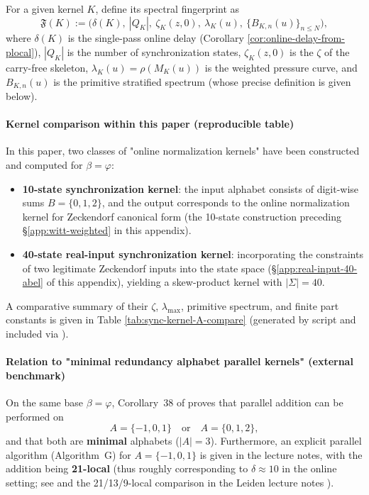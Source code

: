 \begin{definition}\label{def:kernel-spectral-fingerprint}
For a given kernel $K$, define its spectral fingerprint as
\[
\mathfrak{F}(K):=\bigl(\delta(K),\ |Q_K|,\ \zeta_K(z,0),\ \lambda_K(u),\ \{B_{K,n}(u)\}_{n\le N}\bigr),
\]
where $\delta(K)$ is the single-pass online delay (Corollary \ref{cor:online-delay-from-plocal}), $|Q_K|$ is the number of synchronization states, $\zeta_K(z,0)$ is the $\zeta$ of the carry-free skeleton, $\lambda_K(u)=\rho(M_K(u))$ is the weighted pressure curve, and $B_{K,n}(u)$ is the primitive stratified spectrum (whose precise definition is given below).
\end{definition}

\paragraph{Kernel comparison within this paper (reproducible table)}
In this paper, two classes of "online normalization kernels" have been constructed and computed for $\beta=\varphi$:
\begin{itemize}
  \item \textbf{10-state synchronization kernel}: the input alphabet consists of digit-wise sums $B=\{0,1,2\}$, and the output corresponds to the online normalization kernel for Zeckendorf canonical form (the 10-state construction preceding \S\ref{app:witt-weighted} in this appendix).
  \item \textbf{40-state real-input synchronization kernel}: incorporating the constraints of two legitimate Zeckendorf inputs into the state space (\S\ref{app:real-input-40-abel} of this appendix), yielding a skew-product kernel with $|\Sigma|=40$.
\end{itemize}
A comparative summary of their $\zeta$, $\lambda_{\max}$, primitive spectrum, and finite part constants is given in Table \ref{tab:sync-kernel-A-compare} (generated by script and included via \verb||).


\paragraph{Relation to "minimal redundancy alphabet parallel kernels" (external benchmark)}
On the same base $\beta=\varphi$, Corollary~38 of \cite{FrougnyPelantovaSvobodova2013MinimalDigitSets} proves that parallel addition can be performed on
\[
A=\{-1,0,1\}\quad\text{or}\quad A=\{0,1,2\},
\]
and that both are \textbf{minimal} alphabets ($|A|=3$). Furthermore, an explicit parallel algorithm (Algorithm~G) for $A=\{-1,0,1\}$ is given in the lecture notes, with the addition being \textbf{21-local} (thus roughly corresponding to $\delta\approx 10$ in the online setting; see \cite{FrougnyHellerPelantovaSvobodovaParallelAlgorithmsSlides} and the 21/13/9-local comparison in the Leiden lecture notes \cite{Frougny2012NumbersAsStreamsLeiden}).

